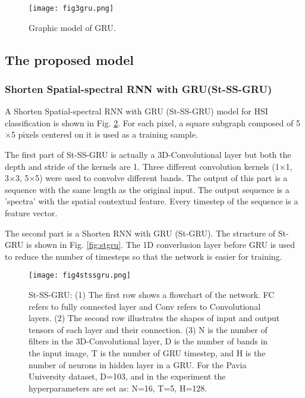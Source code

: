 \documentclass[conference]{IEEEtran}
\begin{document}
\begin{figure}[htbp]
    \centerline{\texttt{[image: fig3gru.png]}}
    \caption{Graphic model of GRU.}
    \label{fig:gru}
\end{figure}

\subsection{The proposed model}

\subsubsection{Shorten Spatial-spectral RNN with GRU(St-SS-GRU)}

A Shorten Spatial-spectral RNN with GRU (St-SS-GRU) model for HSI classification is
shown in Fig. \ref{fig:stssgru}. For each pixel, a square subgraph composed of
5$\times$5 pixels centered on it is used as a training sample.

The first part of St-SS-GRU is actually a 3D-Convolutional layer but both the depth and
stride of the kernels are 1. Three different convolution kernels (1×1, 3×3, 5×5) were
used to convolve different bands. The output of this part is a sequence with the same
length as the original input. The output sequence is a 'spectra' with the spatial
contextual feature. Every timestep of the sequence is a feature vector.

The second part is a Shorten RNN with GRU (St-GRU). The structure of St-GRU is shown in
Fig. \ref{fig:stgru}. The 1D converlusion layer before GRU is used to reduce the number
of timesteps so that the network is easier for training.

\begin{figure}[htbp]
    \centerline{\texttt{[image: fig4stssgru.png]}}
    \caption{St-SS-GRU: (1) The first row shows a flowchart of the network. FC refers
    to fully connected layer and Conv refers to Convolutional layers. (2) The second
    row illustrates the shapes of input and output tensors of each layer and their
    connection. (3) N is the number of filters in the 3D-Convolutional layer, D is
    the number of bands in the input image, T is the number of GRU timestep, and H
    is the number of neurons in hidden layer in a GRU. For the Pavia University dataset,
    D=103, and in the experiment the hyperparameters are set as: N=16, T=5, H=128.}
    \label{fig:stssgru}
\end{figure}
\end{document}
